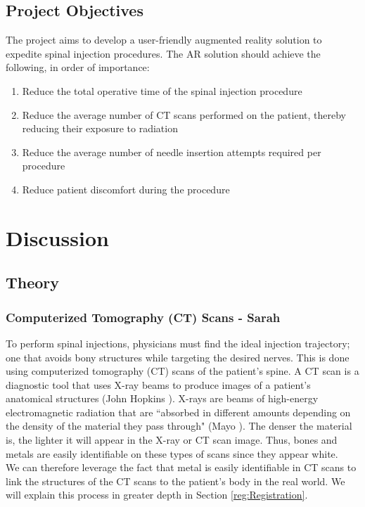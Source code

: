 \documentclass[12pt]{article}
\begin{document}
\subsection{Project Objectives}
The project aims to develop a user-friendly augmented reality solution to expedite spinal injection procedures. The AR solution should achieve the following, in order of importance:
\begin{enumerate}
    \item Reduce the total operative time of the spinal injection procedure
    \item Reduce the average number of CT scans performed on the patient, thereby reducing their exposure to radiation
    \item Reduce the average number of needle insertion attempts required per procedure
    \item Reduce patient discomfort during the procedure
\end{enumerate}

\section{Discussion}
\subsection{Theory}
\subsubsection{Computerized Tomography (CT) Scans - Sarah}
To perform spinal injections, physicians must find the ideal injection trajectory; one that avoids bony structures while targeting the desired nerves. This is done using computerized tomography (CT) scans of the patient's spine. A CT scan is a diagnostic tool that uses X-ray beams to produce images of a patient's anatomical structures (John Hopkins \cite{HopkinsMed}). X-rays are beams of high-energy electromagnetic radiation that are ``absorbed in different amounts depending on the density of the material they pass through" (Mayo \cite{MayoClinic}). The denser the material is, the lighter it will appear in the X-ray or CT scan image. Thus, bones and metals are easily identifiable on these types of scans since they appear white.\\ 

We can therefore leverage the fact that metal is easily identifiable in CT scans to link the structures of the CT scans to the patient's body in the real world. We will explain this process in greater depth in Section \ref{reg:Registration}.\\
\end{document}
